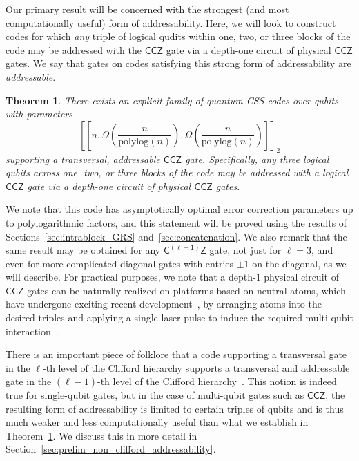 \documentclass[11pt]{article}
\newtheorem{theorem}{Theorem}[section]
\theoremstyle{definition}
\newcommand{\CCZ}{\mathsf{CCZ}}
\newcommand{\CLZ}{\mathsf{C^{(\ell-1)}Z}}
\begin{document}
    Our primary result will be concerned with the strongest (and most computationally useful) form of addressability. Here, we will look to construct codes for which \textit{any} triple of logical qudits within one, two, or three blocks of the code may be addressed with the $\CCZ$ gate via a depth-one circuit of physical $\CCZ$ gates. We say that gates on codes satisfying this strong form of addressability are \emph{addressable}.
    \begin{theorem}\label{thm:main_result_1}
        There exists an explicit family of quantum CSS codes over qubits with parameters
        \begin{equation}
            \left[\left[n,\Omega\left(\frac{n}{\text{polylog}(n)}\right),\Omega\left(\frac{n}{\text{polylog}(n)}\right)\right]\right]_2
        \end{equation}
        supporting a transversal, addressable $\CCZ$ gate. Specifically, any three logical qubits across one, two, or three blocks of the code may be addressed with a logical $\CCZ$ gate via a depth-one circuit of physical $\CCZ$ gates.
    \end{theorem}
    We note that this code has asymptotically optimal error correction parameters up to polylogarithmic factors, and this statement will be proved using the results of Sections~\ref{sec:intrablock_GRS} and~\ref{sec:concatenation}. 
    We also remark that the same result may be obtained for any $\CLZ$ gate, not just for $\ell = 3$, and even for more complicated diagonal gates with entries $\pm 1$ on the diagonal, as we will describe. 
    For practical purposes, we note that a depth-1 physical circuit of $\CCZ$ gates can be naturally realized on platforms based on neutral atoms, 
    which have undergone exciting recent development~\cite{bluvstein2024logical}, by arranging atoms into the desired triples and applying a single laser pulse to induce the required multi-qubit interaction~\cite{levine2019parallel,evered2023high}.
    

    There is an important piece of folklore that a code supporting a transversal gate in the $\ell$-th level of the Clifford hierarchy supports a transversal and addressable gate in the $(\ell-1)$-th level of the Clifford hierarchy~\cite{hsin2024classifying,lin2024transversal,breuckmann2024cups}. This notion is indeed true for single-qubit gates, but in the case of multi-qubit gates such as $\CCZ$, the resulting form of addressability is limited to certain triples of qubits and is thus much weaker and less computationally useful than what we establish in Theorem~\ref{thm:main_result_1}. We discuss this in more detail in Section~\ref{sec:prelim_non_clifford_addressability}. 
    
\end{document}
